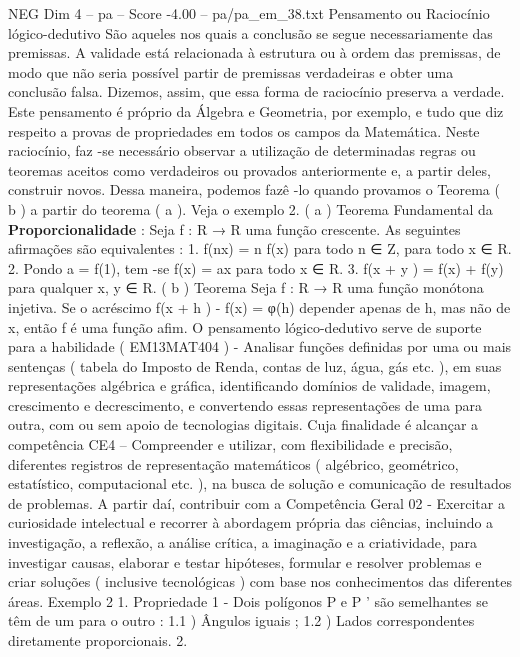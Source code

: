 \begin{textsample}{NEG Dim 4 – pa – Score -4.00 – pa/pa\_em\_38.txt}  \label{ex:f4_neg_271}
Pensamento ou Raciocínio lógico-dedutivo São aqueles nos quais a conclusão se segue necessariamente das premissas.
A validade está relacionada à estrutura ou à ordem das premissas, de modo que não seria possível partir de premissas verdadeiras e obter uma conclusão falsa.
Dizemos, assim, que essa forma de raciocínio preserva a verdade.
Este pensamento é próprio da Álgebra e Geometria, por exemplo, e tudo que diz respeito a provas de propriedades em todos os campos da Matemática.
Neste raciocínio, faz -se necessário observar a utilização de determinadas regras ou teoremas aceitos como verdadeiros ou provados anteriormente e, a partir deles, construir novos.
Dessa maneira, podemos fazê -lo quando provamos o Teorema ( b ) a partir do teorema ( a ).
Veja o exemplo 2. ( a ) Teorema Fundamental da \textbf{Proporcionalidade} : Seja f : R → R uma função crescente.
As seguintes afirmações são equivalentes : 1. f(nx) = n f(x) para todo n ∈ Z, para todo x ∈ R. 2.
Pondo a = f(1), tem -se f(x) = ax para todo x ∈ R. 3. f(x + y ) = f(x) + f(y) para qualquer x, y ∈ R. ( b ) Teorema Seja f : R → R uma função monótona injetiva.
Se o acréscimo f(x + h ) - f(x) = φ(h) depender apenas de h, mas não de x, então f é uma função afim.
O pensamento lógico-dedutivo serve de suporte para a habilidade ( EM13MAT404 ) - Analisar funções definidas por uma ou mais sentenças ( tabela do Imposto de Renda, contas de luz, água, gás etc. ), em suas representações algébrica e gráfica, identificando domínios de validade, imagem, crescimento e decrescimento, e convertendo essas representações de uma para outra, com ou sem apoio de tecnologias digitais.
Cuja finalidade é alcançar a competência CE4 – Compreender e utilizar, com flexibilidade e precisão, diferentes registros de representação matemáticos ( algébrico, geométrico, estatístico, computacional etc. ), na busca de solução e comunicação de resultados de problemas.
A partir daí, contribuir com a Competência Geral 02 - Exercitar a curiosidade intelectual e recorrer à abordagem própria das ciências, incluindo a investigação, a reflexão, a análise crítica, a imaginação e a criatividade, para investigar causas, elaborar e testar hipóteses, formular e resolver problemas e criar soluções ( inclusive tecnológicas ) com base nos conhecimentos das diferentes áreas.
Exemplo 2 1.
Propriedade 1 - Dois polígonos P e P ’ são semelhantes se têm de um para o outro : 1.1 ) Ângulos iguais ; 1.2 ) Lados correspondentes diretamente proporcionais. 2.

\end{textsample}
